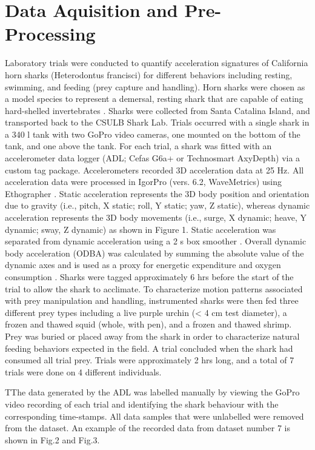\documentclass[conference]{IEEEtran}
\begin{document}
\section{Data Aquisition and Pre-Processing}
Laboratory trials were conducted to quantify acceleration signatures of California horn sharks (Heterodontus francisci) for different behaviors including resting, swimming, and feeding (prey capture and handling). Horn sharks were chosen as a model species to represent a demersal, resting shark that are capable of eating hard-shelled invertebrates \cite{8, 9, 10}. Sharks were collected from Santa Catalina Island, and transported back to the CSULB Shark Lab. Trials occurred with a single shark in a 340 l tank with two GoPro video cameras, one mounted on the bottom of the tank, and one above the tank. For each trial, a shark was fitted with an accelerometer data logger (ADL; Cefas G6a+ or Technosmart AxyDepth) via a custom tag package. Accelerometers recorded 3D acceleration data at 25 Hz. All acceleration data were processed in IgorPro (vers. 6.2, WaveMetrics) using Ethographer \cite{11}. Static acceleration represents the 3D body position and orientation due to gravity (i.e., pitch, X static; roll, Y static; yaw, Z static), whereas dynamic acceleration represents the 3D body movements (i.e., surge, X dynamic; heave, Y dynamic; sway, Z dynamic) as shown in Figure 1. Static acceleration was separated from dynamic acceleration using a 2 s box smoother \cite{12}. Overall dynamic body acceleration (ODBA) was calculated by summing the absolute value of the dynamic axes and is used as a proxy for energetic expenditure and oxygen consumption \cite{13}. Sharks were tagged approximately 6 hrs before the start of the trial to allow the shark to acclimate. To characterize motion patterns associated with prey manipulation and handling, instrumented sharks were then fed three different prey types including a live purple urchin (< 4 cm test diameter), a frozen and thawed squid (whole, with pen), and a frozen and thawed shrimp. Prey was buried or placed away from the shark in order to characterize natural feeding behaviors expected in the field. A trial concluded when the shark had consumed all trial prey. Trials were approximately 2 hrs long, and a total of 7 trials were done on 4 different individuals. 


TThe data generated by the ADL was labelled manually by viewing the GoPro video recording of each trial and identifying the shark behaviour with the corresponding time-stamps. All data samples that were unlabelled were removed from the dataset. An example of the recorded data from dataset number 7 is shown in Fig.2 and Fig.3.
\end{document}
